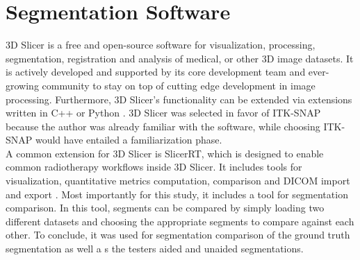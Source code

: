 \section{Segmentation Software}\label{s:segSoftware}
3D Slicer is a free and open-source software for visualization, processing, segmentation, registration and analysis of medical, or other 3D image datasets.
It is actively developed and supported by its core development team and ever-growing community to stay on top of cutting edge development in image processing.
Furthermore, 3D Slicer's functionality can be extended via extensions written in C++ or Python \cite{kikinis3DSlicerPlatform2014}.
3D Slicer was selected in favor of ITK-SNAP because the author was already familiar with the software, while choosing ITK-SNAP would have entailed a familiarization phase.\\
A common extension for 3D Slicer is SlicerRT, which is designed to enable common radiotherapy workflows inside 3D Slicer.
It includes tools for visualization, quantitative metrics computation, comparison and DICOM import and export \cite{pinterSlicerRTRadiationTherapy2012}.
Most importantly for this study, it includes a tool for segmentation comparison.
In this tool, segments can be compared by simply loading two different datasets and choosing the appropriate segments to compare against each other.
To conclude, it was used for segmentation comparison of the ground truth segmentation as well a	s the testers aided and unaided segmentations.

